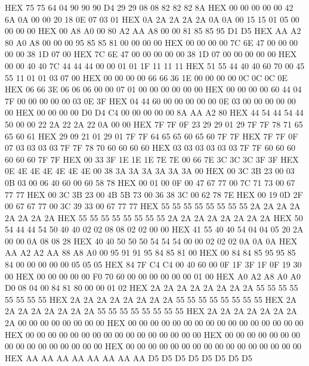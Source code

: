 \documentclass[10pt]{report}
\begin{document}
    HEX     75 75 64 04 90 90 90 D4 29 29 08 08 82 82 82 8A
    HEX     00 00 00 00 00 42 6A 0A 00 00 20 18 0E 07 03 01
    HEX     0A 2A 2A 2A 2A 0A 0A 00 15 15 01 05 00 00 00 00
    HEX     00 A8 A0 00 80 A2 AA A8 00 00 81 85 85 95 D1 D5
    HEX     AA A2 80 A0 A8 00 00 00 95 85 85 81 00 00 00 00
    HEX     00 00 00 00 7C 6E 47 00 00 00 00 00 38 1D 07 00
    HEX     7C 6E 47 00 00 00 00 00 38 1D 07 00 00 00 00 00
    HEX     00 00 40 40 7C 44 44 44 00 00 01 01 1F 11 11 11
    HEX     51 55 44 40 40 60 70 00 45 55 11 01 01 03 07 00
    HEX     00 00 00 00 66 66 36 1E 00 00 00 00 0C 0C 0C 0E
    HEX     06 66 3E 06 06 06 00 00 07 01 00 00 00 00 00 00
    HEX     00 00 00 00 60 44 04 7F 00 00 00 00 00 03 0E 3F
    HEX     04 44 60 00 00 00 00 00 0E 03 00 00 00 00 00 00
    HEX     00 00 00 00 D0 D4 C4 00 00 00 00 00 8A AA A2 80
    HEX     44 54 44 54 44 50 00 00 22 2A 22 2A 22 0A 00 00
    HEX     7F 7F 0F 23 29 29 01 29 7F 7F 78 71 65 65 60 61
    HEX     29 09 21 01 29 01 7F 7F 64 65 65 60 65 60 7F 7F
    HEX     7F 7F 0F 07 03 03 03 03 7F 7F 78 70 60 60 60 60
    HEX     03 03 03 03 03 03 7F 7F 60 60 60 60 60 60 7F 7F
    HEX     00 33 3F 1E 1E 1E 7E 7E 00 66 7E 3C 3C 3C 3F 3F
    HEX     0E 4E 4E 4E 4E 4E 4E 00 38 3A 3A 3A 3A 3A 3A 00
    HEX     00 3C 3B 23 00 03 0B 03 00 06 40 60 00 60 58 78
    HEX     00 01 00 0F 00 47 67 77 00 7C 71 73 00 67 77 77
    HEX     00 3C 3B 23 00 4B 5B 73 00 36 38 3C 00 62 78 7E
    HEX     00 19 0D 2F 00 67 67 77 00 3C 39 33 00 67 77 77
    HEX     55 55 55 55 55 55 55 55 2A 2A 2A 2A 2A 2A 2A 2A
    HEX     55 55 55 55 55 55 55 55 2A 2A 2A 2A 2A 2A 2A 2A
    HEX     50 54 44 44 54 50 40 40 02 02 08 08 02 02 00 00
    HEX     41 55 40 40 54 04 04 05 20 2A 00 00 0A 08 08 28
    HEX     40 40 50 50 50 54 54 54 00 00 02 02 02 0A 0A 0A
    HEX     AA A2 A2 AA 88 A8 A0 00 95 91 91 95 84 85 81 00
    HEX     00 84 84 85 95 95 85 84 00 00 00 00 00 05 05 05
    HEX     84 7F C4 C4 00 40 60 00 0F 1F 3F 1F 0F 19 30 00
    HEX     00 00 00 00 00 F0 70 60 00 00 00 00 00 00 01 00
    HEX     A0 A2 A8 A0 A0 D0 08 04 00 84 81 80 00 00 01 02
    HEX     2A 2A 2A 2A 2A 2A 2A 2A 55 55 55 55 55 55 55 55
    HEX     2A 2A 2A 2A 2A 2A 2A 2A 55 55 55 55 55 55 55 55
    HEX     2A 2A 2A 2A 2A 2A 2A 2A 55 55 55 55 55 55 55 55
    HEX     2A 2A 2A 2A 2A 2A 2A 2A 00 00 00 00 00 00 00 00
    HEX     00 00 00 00 00 00 00 00 00 00 00 00 00 00 00 00
    HEX     00 00 00 00 00 00 00 00 00 00 00 00 00 00 00 00
    HEX     00 00 00 00 00 00 00 00 00 00 00 00 00 00 00 00
    HEX     00 00 00 00 00 00 00 00 00 00 00 00 00 00 00 00
    HEX     AA AA AA AA AA AA AA AA D5 D5 D5 D5 D5 D5 D5 D5
\end{document}
